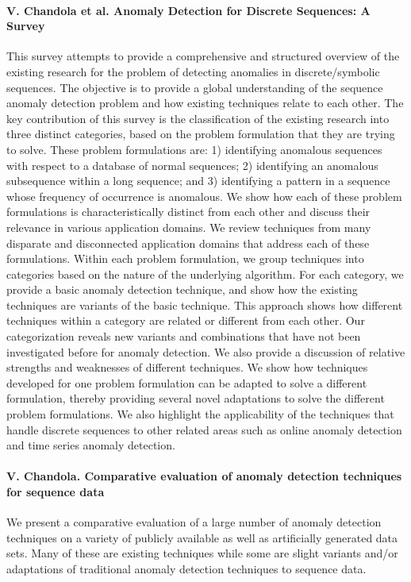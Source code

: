 \paragraph*{V. Chandola et al. Anomaly Detection for Discrete Sequences: A Survey}\cite{chandola2012anomaly}
This survey attempts to provide a comprehensive and structured overview of the existing research for the problem of detecting anomalies in discrete/symbolic sequences. The objective is to provide a global understanding of the sequence anomaly detection problem and how existing techniques relate to each other. The key contribution of this survey is the classification of the existing research into three distinct categories, based on the problem formulation that they are trying to solve. These problem formulations are: 1) identifying anomalous sequences with respect to a database of normal sequences; 2) identifying an anomalous subsequence within a long sequence; and 3) identifying a pattern in a sequence whose frequency of occurrence is anomalous. We show how each of these problem formulations is characteristically distinct from each other and discuss their relevance in various application domains. We review techniques from many disparate and disconnected application domains that address each of these formulations. Within each problem formulation, we group techniques into categories based on the nature of the underlying algorithm. For each category, we provide a basic anomaly detection technique, and show how the existing techniques are variants of the basic technique. This approach shows how different techniques within a category are related or different from each other. Our categorization reveals new variants and combinations that have not been investigated before for anomaly detection. We also provide a discussion of relative strengths and weaknesses of different techniques. We show how techniques developed for one problem formulation can be adapted to solve a different formulation, thereby providing several novel adaptations to solve the different problem formulations. We also highlight the applicability of the techniques that handle discrete sequences to other related areas such as online anomaly detection and time series anomaly detection.

\paragraph*{V. Chandola. Comparative evaluation of anomaly detection techniques for sequence data}\cite{chandola2008comparative} We present a comparative evaluation of a large number of anomaly detection techniques on a variety of publicly available as well as artificially generated data sets. Many of these are existing techniques while some are slight variants and/or adaptations of traditional anomaly detection techniques to sequence data.

